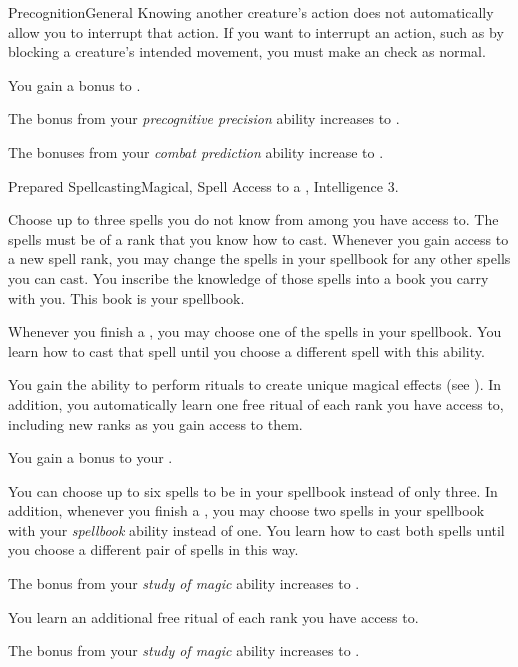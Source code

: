 \begin{feat}{Precognition}{General}
        Knowing another creature's action does not automatically allow you to interrupt that action.
        If you want to interrupt an action, such as by blocking a creature's intended movement, you must make an  check as normal.

         You gain a  bonus to .

         The bonus from your \textit{precognitive precision} ability increases to .

         The bonuses from your \textit{combat prediction} ability increase to .
    \end{feat}

    \begin{feat}{Prepared Spellcasting}{Magical, Spell}
        \featpre Access to a , Intelligence 3.

         Choose up to three spells you do not know from among  you have access to.
        The spells must be of a rank that you know how to cast.
        Whenever you gain access to a new spell rank, you may change the spells in your spellbook for any other spells you can cast.
        You inscribe the knowledge of those spells into a book you carry with you.
        This book is your spellbook.
        
        Whenever you finish a , you may choose one of the spells in your spellbook.
        You learn how to cast that spell until you choose a different spell with this ability.

         You gain the ability to perform rituals to create unique magical effects (see ).
        In addition, you automatically learn one free ritual of each rank you have access to, including new ranks as you gain access to them.

         You gain a  bonus to your .

         You can choose up to six spells to be in your spellbook instead of only three.
        In addition, whenever you finish a , you may choose two spells in your spellbook with your \textit{spellbook} ability instead of one.
        You learn how to cast both spells until you choose a different pair of spells in this way.

         The bonus from your \textit{study of magic} ability increases to .

         You learn an additional free ritual of each rank you have access to.

         The bonus from your \textit{study of magic} ability increases to .
    \end{feat}


